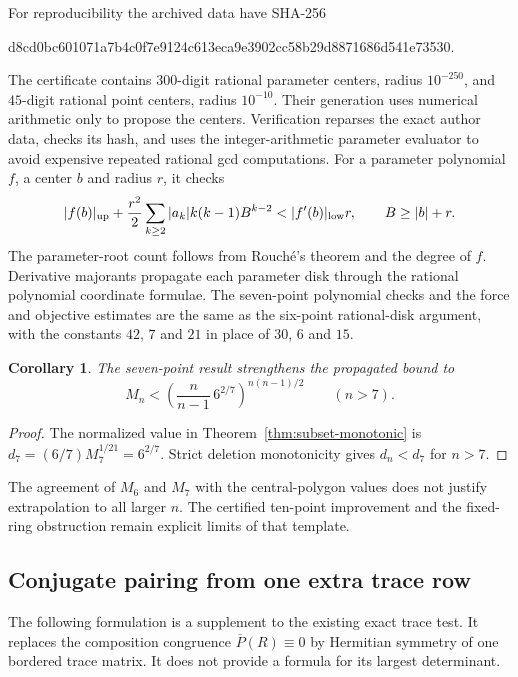\documentclass[11pt]{article}
\newtheorem{corollary}[theorem]{Corollary}
\theoremstyle{remark}
\numberwithin{equation}{section}
\begin{document}
For reproducibility the archived data have SHA-256
\begin{center}\footnotesize\ttfamily
d8cd0bc601071a7b4c0f7e9124c613eca9e3902cc58b29d8871686d541e73530.
\end{center}
The certificate contains $300$-digit rational parameter centers,
radius $10^{-250}$, and $45$-digit rational point centers, radius
$10^{-10}$. Their generation uses numerical arithmetic only to
propose the centers. Verification reparses the exact author data,
checks its hash, and uses the integer-arithmetic parameter evaluator
to avoid expensive repeated rational gcd computations.
For a parameter polynomial $f$, a center $b$ and radius $r$, it
checks
\[
 |f(b)|_{\rm up}+\frac{r^2}{2}
            \sum_{k\ge2}|a_k|k(k-1)B^{k-2}
       <|f'(b)|_{\rm low}r,
 \qquad B\ge |b|+r.
\]
The parameter-root count follows from Rouch\'e's theorem and the
degree of $f$. Derivative majorants propagate each parameter disk
through the rational polynomial coordinate formulae. The
seven-point polynomial checks and the force and objective estimates
are the same as the six-point rational-disk argument, with the
constants $42$, $7$ and $21$ in place of $30$, $6$ and $15$.

\begin{corollary}\label{cor:seven-seed-all-n}
The seven-point result strengthens the propagated bound to
\[
 M_n<\left(\frac n{n-1}\,6^{2/7}\right)^{n(n-1)/2}
                    \qquad(n>7).
\]
\end{corollary}
\begin{proof}
The normalized value in Theorem~\ref{thm:subset-monotonic} is
$d_7=(6/7)M_7^{1/21}=6^{2/7}$. Strict deletion monotonicity gives
$d_n<d_7$ for $n>7$.
\end{proof}
The agreement of $M_6$ and $M_7$ with the central-polygon values
does not justify extrapolation to all larger $n$.
The certified ten-point improvement and the fixed-ring obstruction
remain explicit limits of that template.

\subsection{Conjugate pairing from one extra trace row}
The following formulation is a supplement to the existing exact
trace test. It replaces the composition congruence
$\overline P(R)\equiv0$ by Hermitian symmetry of one bordered
trace matrix. It does not provide a formula for its largest determinant.
\end{document}
